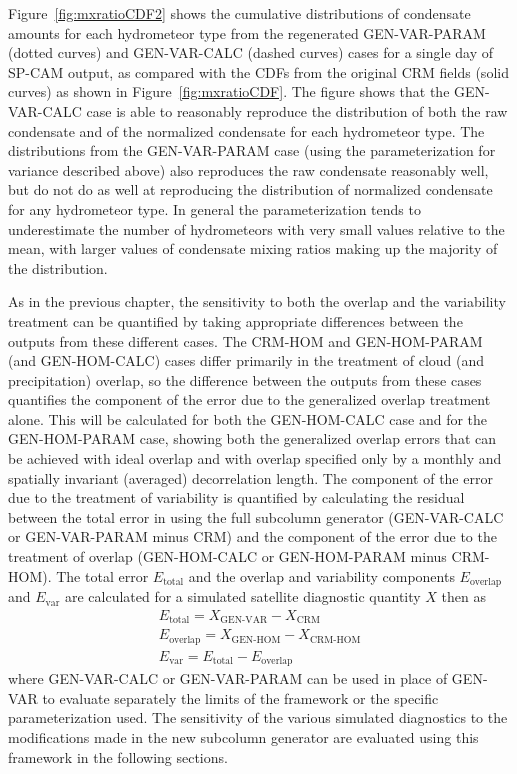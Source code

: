 Figure~\ref{fig:mxratioCDF2} shows the cumulative distributions of
condensate amounts for each hydrometeor type from the regenerated
GEN-VAR-PARAM (dotted curves) and GEN-VAR-CALC (dashed curves) cases for
a single day of SP-CAM output, as compared with the CDFs from the
original CRM fields (solid curves) as shown in
Figure~\ref{fig:mxratioCDF}. The figure shows that the GEN-VAR-CALC case
is able to reasonably reproduce the distribution of both the raw
condensate and of the normalized condensate for each hydrometeor type.
The distributions from the GEN-VAR-PARAM case (using the
parameterization for variance described above) also reproduces the raw
condensate reasonably well, but do not do as well at reproducing the
distribution of normalized condensate for any hydrometeor type. In
general the parameterization tends to underestimate the number of
hydrometeors with very small values relative to the mean, with larger
values of condensate mixing ratios making up the majority of the
distribution.

As in the previous chapter, the sensitivity to both the overlap and the
variability treatment can be quantified by taking appropriate
differences between the outputs from these different cases. The CRM-HOM
and GEN-HOM-PARAM (and GEN-HOM-CALC) cases differ primarily in the
treatment of cloud (and precipitation) overlap, so the difference
between the outputs from these cases quantifies the component of the
error due to the generalized overlap treatment alone. This will be
calculated for both the GEN-HOM-CALC case and for the GEN-HOM-PARAM
case, showing both the generalized overlap errors that can be achieved
with ideal overlap and with overlap specified only by a monthly and
spatially invariant (averaged) decorrelation length. The component of
the error due to the treatment of variability is quantified by
calculating the residual between the total error in using the full
subcolumn generator (GEN-VAR-CALC or GEN-VAR-PARAM minus CRM) and the
component of the error due to the treatment of overlap (GEN-HOM-CALC or
GEN-HOM-PARAM minus CRM-HOM). The total error \(E_\textrm{total}\) and
the overlap and variability components \(E_\textrm{overlap}\) and
\(E_\textrm{var}\) are calculated for a simulated satellite diagnostic
quantity \(X\) then as \[\begin{gathered} 
    E_\textrm{total} = X_\textrm{GEN-VAR} - X_\textrm{CRM} \\ 
    E_\textrm{overlap} = X_\textrm{GEN-HOM} - X_\textrm{CRM-HOM} \\ 
    E_\textrm{var} = E_\textrm{total} - E_\textrm{overlap}
\end{gathered}\] where GEN-VAR-CALC or GEN-VAR-PARAM can be used in
place of GEN-VAR to evaluate separately the limits of the framework or
the specific parameterization used. The sensitivity of the various
simulated diagnostics to the modifications made in the new subcolumn
generator are evaluated using this framework in the following sections.

